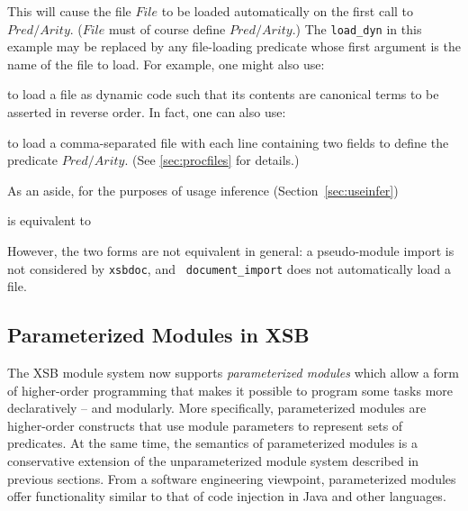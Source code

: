 
\noindent This will cause the file $File$ to be loaded automatically
on the first call to $Pred/Arity$.  ($File$ must of course define
$Pred/Arity$.)  The {\tt load\_dyn} in this example may be replaced by
any file-loading predicate whose first argument is the name of the
file to load.  For example, one might also use:


\noindent to load a file as dynamic code such that its contents are
canonical terms to be asserted in reverse order.  In fact, one can
also use:


\noindent to load a comma-separated file with each line containing two
fields to define the predicate $Pred/Arity$.  (See \ref{sec:procfiles}
for details.)

As an aside, for the purposes of usage inference
(Section~\ref{sec:useinfer}) 


\noindent is equivalent to 

  
\noindent However, the two forms are not equivalent in general: a
pseudo-module import is not considered by {\tt xsbdoc}, and {\tt
  document\_import} does not automatically load a file.

\subsection{Parameterized Modules in XSB}

The XSB module system now supports {\em parameterized modules} which
allow a form of higher-order programming that makes it possible to
program some tasks more declaratively -- and modularly.  More
specifically, parameterized modules are higher-order constructs that
use module parameters to represent sets of predicates.  At the same
time, the semantics of parameterized modules is a conservative
extension of the unparameterized module system described in previous
sections. From a software engineering viewpoint, parameterized modules
offer functionality similar to that of code injection in Java and
other languages.

